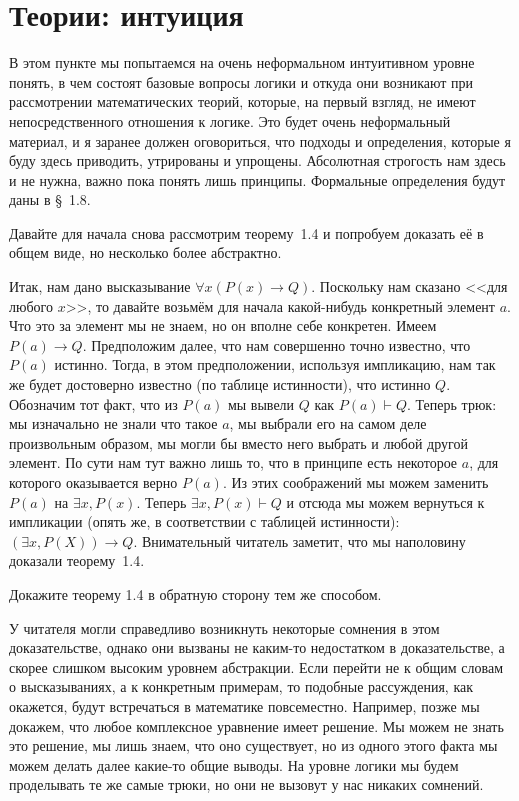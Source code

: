 \section{Теории: интуиция}

В этом пункте мы попытаемся на очень неформальном интуитивном уровне понять, в чем состоят базовые вопросы логики и откуда они возникают при рассмотрении математических теорий, которые, на первый взгляд, не имеют непосредственного отношения к логике. Это будет очень неформальный материал, и я заранее должен оговориться, что подходы и определения, которые я буду здесь приводить, утрированы и упрощены. Абсолютная строгость нам здесь и не нужна, важно пока понять лишь принципы. Формальные определения будут даны в \S~1.8.

Давайте для начала снова рассмотрим теорему~1.4 и попробуем доказать её в общем виде, но несколько более абстрактно.

Итак, нам дано высказывание $\forall x (P(x)\to Q)$. Поскольку нам сказано <<для любого $x$>>, то давайте возьмём для начала какой-нибудь конкретный элемент $a$. Что это за элемент мы не знаем, но он вполне себе конкретен. Имеем $P(a)\to Q$. Предположим далее, что нам совершенно точно известно, что $P(a)$ истинно. Тогда, в этом предположении, используя импликацию, нам так же будет достоверно известно (по таблице истинности), что истинно $Q$. Обозначим тот факт, что из $P(a)$ мы вывели $Q$ как $P(a)\vdash Q$. Теперь трюк: мы изначально не знали что такое $a$, мы выбрали его на самом деле произвольным образом, мы могли бы вместо него выбрать и любой другой элемент. По сути нам тут важно лишь то, что  в принципе есть некоторое $a$, для которого оказывается верно $P(a)$. Из этих соображений мы можем заменить $P(a)$ на $\exists x, P(x)$. Теперь $\exists x, P(x) \vdash Q$ и отсюда мы можем вернуться к импликации (опять же, в соответствии с таблицей истинности): $(\exists x, P(X))\to Q$. Внимательный читатель заметит, что мы наполовину доказали теорему~1.4.

\begin{exercise}
Докажите теорему 1.4 в обратную сторону тем же способом.
\end{exercise}

У читателя могли справедливо возникнуть некоторые сомнения в этом доказательстве, однако они вызваны не каким-то недостатком в доказательстве, а скорее слишком высоким уровнем абстракции. Если перейти не к общим словам о высказываниях, а к конкретным примерам, то подобные рассуждения, как окажется, будут встречаться в математике повсеместно. Например, позже мы докажем, что любое комплексное уравнение имеет решение. Мы можем не знать это решение, мы лишь знаем, что оно существует, но из одного этого факта мы можем делать далее какие-то общие выводы. На уровне логики мы будем проделывать те же самые трюки, но они не вызовут у нас никаких сомнений.

